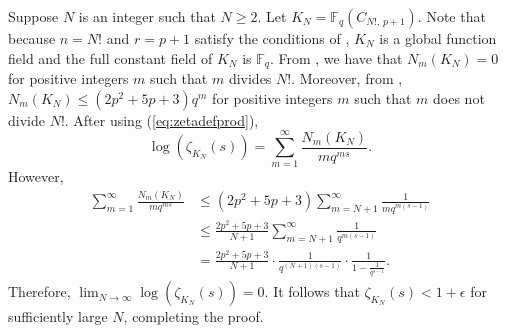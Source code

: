 \documentclass[12pt,letterpaper]{amsart}
\theoremstyle{definition}
\begin{document}
Suppose $N$ is an integer such that $N\geq 2$. Let $K_N=\mathbb{F}_q(C_{N!,\,p+1})$. Note that because $n=N!$ and $r=p+1$ satisfy the conditions of , $K_N$ is a global function field and the full constant field of $K_N$ is $\mathbb{F}_q$. From , we have that $N_m(K_N)=0$ for positive integers $m$ such that $m$ divides $N!$. Moreover, from , $N_m(K_N)\leq (2p^2+5p+3)q^m$ for positive integers $m$ such that $m$ does not divide $N!$. After using (\ref{eq:zetadefprod}), 
\[
\log(\zeta_{K_N}(s))=\sum_{m=1}^\infty \frac{N_m(K_N)}{mq^{ms}}.
\]
However,
\begin{align*}
\sum_{m=1}^\infty\frac{N_m(K_N)}{mq^{ms}}
& \leq (2p^2+5p+3)\sum_{m= N+1}^\infty\frac{1}{mq^{m(s-1)}} \\
& \leq \frac{2p^2+5p+3}{N+1}\sum_{m=N+1}^\infty \frac{1}{q^{m(s-1)}} \\
& = \frac{2p^2+5p+3}{N+1}\cdot\frac{1}{q^{(N+1)(s-1)}}\cdot\frac{1}{1-\frac{1}{q^{s-1}}}.
\end{align*}
Therefore, $\lim_{N\rightarrow\infty}\log(\zeta_{K_N}(s))=0$. It follows that $\zeta_{K_N}(s)<1+\epsilon$ for sufficiently large $N$, completing the proof.


\end{document}

